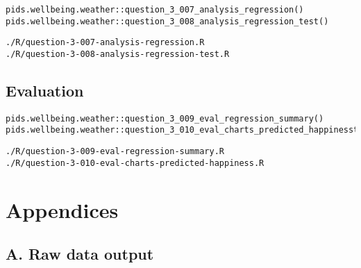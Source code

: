 \documentclass[12pt, oneside, openany]{book}
\begin{document}
\begin{verbatim}
pids.wellbeing.weather::question_3_007_analysis_regression()
pids.wellbeing.weather::question_3_008_analysis_regression_test()
\end{verbatim}

\begin{verbatim}
./R/question-3-007-analysis-regression.R
./R/question-3-008-analysis-regression-test.R
\end{verbatim}

\section*{Evaluation}

\begin{verbatim}
pids.wellbeing.weather::question_3_009_eval_regression_summary()
pids.wellbeing.weather::question_3_010_eval_charts_predicted_happinesst()
\end{verbatim}

\begin{verbatim}
./R/question-3-009-eval-regression-summary.R
./R/question-3-010-eval-charts-predicted-happiness.R
\end{verbatim}

\pagebreak
 


\chapter*{Appendices}
\newpage

\section*{A. Raw data output}
\label{appendix:raw-data-output}

\backmatter
\end{document}
